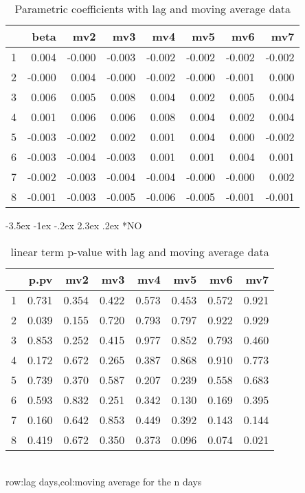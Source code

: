 \documentclass[a4paper, 12pt]{article}
\makeatletter
\def\large{\fontsize{14}{20}\selectfont}
\renewcommand\subsection{\@startsection {subsection}{1}{\z@}%
                                   {-3.5ex \@plus -1ex \@minus -.2ex}%
                                   {2.3ex \@plus.2ex}%
                                   {\centering\normalfont\large\bfseries}}
\makeatother
\begin{document}
\begin{table}[h]
\centering
\caption{Parametric coefficients with lag and moving average data}
\begin{tabular}{rrrrrrrr}
  \hline
 & beta & mv2 & mv3 & mv4 & mv5 & mv6 & mv7 \\
  \hline
1 & 0.004 & -0.000 & -0.003 & -0.002 & -0.002 & -0.002 & -0.002 \\
  2 & -0.000 & 0.004 & -0.000 & -0.002 & -0.000 & -0.001 & 0.000 \\
  3 & 0.006 & 0.005 & 0.008 & 0.004 & 0.002 & 0.005 & 0.004 \\
  4 & 0.001 & 0.006 & 0.006 & 0.008 & 0.004 & 0.002 & 0.004 \\
  5 & -0.003 & -0.002 & 0.002 & 0.001 & 0.004 & 0.000 & -0.002 \\
  6 & -0.003 & -0.004 & -0.003 & 0.001 & 0.001 & 0.004 & 0.001 \\
  7 & -0.002 & -0.003 & -0.004 & -0.004 & -0.000 & -0.000 & 0.002 \\
  8 & -0.001 & -0.003 & -0.005 & -0.006 & -0.005 & -0.001 & -0.001 \\
   \hline
\end{tabular}
\end{table}
\clearpage
\subsection*{NO}
\begin{table}[h]
\centering
\caption{linear term p-value with lag and moving average data}
\begin{tabular}{rrrrrrrr}
  \hline
 & p.pv & mv2 & mv3 & mv4 & mv5 & mv6 & mv7 \\
  \hline
1 & 0.731 & 0.354 & 0.422 & 0.573 & 0.453 & 0.572 & 0.921 \\
  2 & 0.039 & 0.155 & 0.720 & 0.793 & 0.797 & 0.922 & 0.929 \\
  3 & 0.853 & 0.252 & 0.415 & 0.977 & 0.852 & 0.793 & 0.460 \\
  4 & 0.172 & 0.672 & 0.265 & 0.387 & 0.868 & 0.910 & 0.773 \\
  5 & 0.739 & 0.370 & 0.587 & 0.207 & 0.239 & 0.558 & 0.683 \\
  6 & 0.593 & 0.832 & 0.251 & 0.342 & 0.130 & 0.169 & 0.395 \\
  7 & 0.160 & 0.642 & 0.853 & 0.449 & 0.392 & 0.143 & 0.144 \\
  8 & 0.419 & 0.672 & 0.350 & 0.373 & 0.096 & 0.074 & 0.021 \\
   \hline
\end{tabular}
\\row:lag days,col:moving average for the n days
\end{table}
\end{document}
